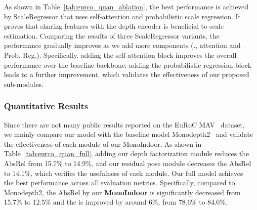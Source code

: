 As shown in Table~\ref{tab:eurco_quan_ablation}, the best performance is achieved by ScaleRegressor that uses self-attention and probabilistic scale regression. It proves that sharing features with the depth encoder is beneficial to scale estimation.
Comparing the results of three ScaleRegressor variants, the performance gradually improves as we add more components (\ie., attention and Prob. Reg.). Specifically, adding the self-attention block improves the overall performance over the baseline backbone; adding the probabilistic regression block leads to a further improvement, which validates the effectiveness of our proposed sub-modules.


\subsubsection{Quantitative Results}
Since there are not many public results reported on the EuRoC MAV~\cite{schonberger2016structure} dataset, we mainly compare our model with the baseline model Monodepth2~\cite{godard2019digging} and validate the effectiveness of each module of our MonoIndoor.
As shown in Table~\ref{tab:eurco_quan_full}, adding our depth factorization module reduces the AbsRel from 15.7\% to 14.9\%, and  our residual pose module decreases the AbsRel to 14.1\%, which verifies the usefulness of each module. Our full model achieves the best performance across all evaluation metrics. Specifically, compared to Monodepth2, the AbsRel by our {\bf MonoIndoor} is significantly decreased from 15.7\% to 12.5\% and the  is improved by around 6\%, from 78.6\% to 84.0\%.


\begin{table}[!h]
    \caption{Ablation results of our MonoIndoor and quantitative comparison with the baseline on the test sequence V2\_01 of EuRoC. Best results are in \textbf{bold}.}
    \label{tab:eurco_quan_full}
    \centering
\end{table}


